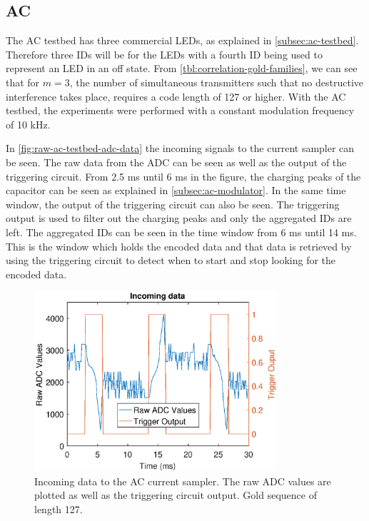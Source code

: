 
\subsection{AC}
\label{subsec:ac-evaluation}


The AC testbed has three commercial LEDs, as explained in \autoref{subsec:ac-testbed}.
Therefore three IDs will be for the LEDs with a fourth ID being used to represent an LED in an off state.
From \autoref{tbl:correlation-gold-families}, we can see that for $m = 3$, the number of simultaneous transmitters such that no destructive interference takes place, requires a code length of 127 or higher.
With the AC testbed, the experiments were performed with a constant modulation frequency of 10 kHz.


In \autoref{fig:raw-ac-testbed-adc-data} the incoming signals to the current sampler can be seen.
The raw data from the ADC can be seen as well as the output of the triggering circuit.
From 2.5 ms until 6 ms in the figure, the charging peaks of the capacitor can be seen as explained in \autoref{subsec:ac-modulator}.
In the same time window, the output of the triggering circuit can also be seen.
The triggering output is used to filter out the charging peaks and only the aggregated IDs are left.
The aggregated IDs can be seen in the time window from 6 ms until 14 ms.
This is the window which holds the encoded data and that data is retrieved by using the triggering circuit to detect when to start and stop looking for the encoded data.

\begin{figure}[ht]
  \centering
  \includegraphics[width=0.8\textwidth]{chapters/evaluation-chapters/hardware/ac/raw-ac-testbed-adc-data.eps}
  \caption{Incoming data to the AC current sampler. The raw ADC values are plotted as well as the triggering circuit output. Gold sequence of length 127.}
  \label{fig:raw-ac-testbed-adc-data}
\end{figure}

